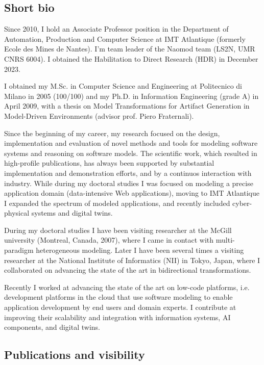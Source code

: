 
\subsection*{Short bio}

Since 2010, I hold an Associate Professor position in the Department of Automation, Production and Computer Science at IMT Atlantique (formerly Ecole des Mines de Nantes). I’m team leader of the Naomod team (LS2N, UMR CNRS 6004). I obtained the Habilitation to Direct Research (HDR) in December 2023.

\smallskip

I obtained my M.Sc. in Computer Science and Engineering at Politecnico di Milano in 2005 (100/100) and my Ph.D. in Information Engineering (grade A) in April 2009, with a thesis on Model Transformations for Artifact Generation in Model-Driven Environments (advisor prof. Piero Fraternali).

Since the beginning of my career, my research focused on the design, implementation and evaluation of novel methods and tools for modeling software systems and reasoning on software models. The scientific work, which resulted in high-profile publications, has always been supported by substantial implementation and demonstration efforts, and by a continuos interaction with industry. While during my doctoral studies I was focused on modeling a precise application domain (data-intensive Web applications), moving to IMT Atlantique I expanded the spectrum of modeled applications, and recently included cyber-physical systems and digital twins. 

During my doctoral studies I have been visiting researcher at the McGill university (Montreal, Canada, 2007), where I came in contact with multi-paradigm heterogeneous modeling. Later I have been several times a visiting researcher at the National Institute of Informatics (NII) in Tokyo, Japan, where I collaborated on advancing the state of the art in bidirectional transformations.

Recently I worked at advancing the state of the art on low-code platforms, i.e. development platforms in the cloud that use software modeling to enable application development by end users and domain experts. I contribute at improving their scalability and integration with information systems, AI components, and digital twins. 

\subsection*{Publications and visibility}

